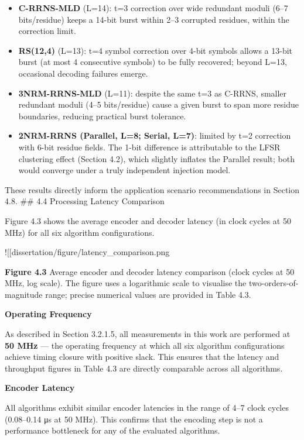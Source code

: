 \documentclass[
  12pt,
  a4paper]{report}
\providecommand{\tightlist}{%
  \setlength{\itemsep}{0pt}\setlength{\parskip}{0pt}}
\begin{document}
\begin{itemize}
\tightlist
\item
  \textbf{C-RRNS-MLD} (L=14): t=3 correction over wide redundant moduli
  (6--7 bits/residue) keeps a 14-bit burst within 2--3 corrupted
  residues, within the correction limit.
\item
  \textbf{RS(12,4)} (L=13): t=4 symbol correction over 4-bit symbols
  allows a 13-bit burst (at most 4 consecutive symbols) to be fully
  recovered; beyond L=13, occasional decoding failures emerge.
\item
  \textbf{3NRM-RRNS-MLD} (L=11): despite the same t=3 as C-RRNS, smaller
  redundant moduli (4--5 bits/residue) cause a given burst to span more
  residue boundaries, reducing practical burst tolerance.
\item
  \textbf{2NRM-RRNS (Parallel, L=8; Serial, L=7)}: limited by t=2
  correction with 6-bit residue fields. The 1-bit difference is
  attributable to the LFSR clustering effect (Section 4.2), which
  slightly inflates the Parallel result; both would converge under a
  truly independent injection model.
\end{itemize}

These results directly inform the application scenario recommendations
in Section 4.8. \#\# 4.4 Processing Latency Comparison

Figure 4.3 shows the average encoder and decoder latency (in clock
cycles at 50 MHz) for all six algorithm configurations.

!{[}{[}dissertation/figure/latency\_comparison.png\textbar522{]}{]}

\textbf{Figure 4.3} Average encoder and decoder latency comparison
(clock cycles at 50 MHz, log scale). The figure uses a logarithmic scale
to visualise the two-orders-of-magnitude range; precise numerical values
are provided in Table 4.3.

\textbf{Operating Frequency}

As described in Section 3.2.1.5, all measurements in this work are
performed at \textbf{50 MHz} --- the operating frequency at which all
six algorithm configurations achieve timing closure with positive slack.
This ensures that the latency and throughput figures in Table 4.3 are
directly comparable across all algorithms.

\textbf{Encoder Latency}

All algorithms exhibit similar encoder latencies in the range of 4--7
clock cycles (0.08--0.14 μs at 50 MHz). This confirms that the encoding
step is not a performance bottleneck for any of the evaluated
algorithms.
\end{document}
